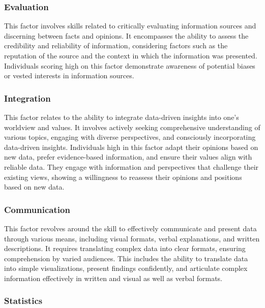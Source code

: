 \documentclass[
  12pt,
  a4paper,
  twoside]{article}
\begin{document}
\subsubsection{Evaluation}\label{evaluation}

This factor involves skills related to critically evaluating information sources and discerning between facts and opinions. It encompasses the ability to assess the credibility and reliability of information, considering factors such as the reputation of the source and the context in which the information was presented. Individuals scoring high on this factor demonstrate awareness of potential biases or vested interests in information sources.

\subsubsection{Integration}\label{integration}

This factor relates to the ability to integrate data-driven insights into one's worldview and values. It involves actively seeking comprehensive understanding of various topics, engaging with diverse perspectives, and consciously incorporating data-driven insights. Individuals high in this factor adapt their opinions based on new data, prefer evidence-based information, and ensure their values align with reliable data. They engage with information and perspectives that challenge their existing views, showing a willingness to reassess their opinions and positions based on new data.

\subsubsection{Communication}\label{communication}

This factor revolves around the skill to effectively communicate and present data through various means, including visual formats, verbal explanations, and written descriptions.
It requires translating complex data into clear formats, ensuring comprehension by varied audiences. This includes the ability to translate data into simple visualizations, present findings confidently, and articulate complex information effectively in written and visual as well as verbal formats.

\subsubsection{Statistics}\label{statistics}
\end{document}
